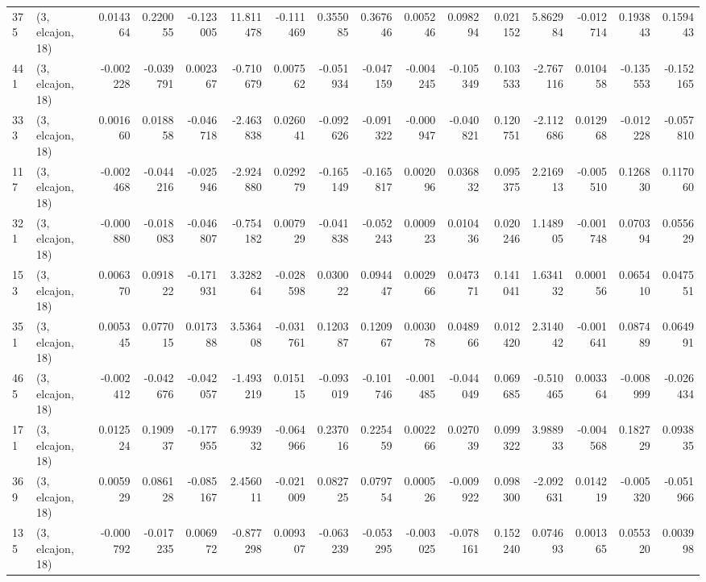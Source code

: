 \begin{tabular}{llrrrrrrrrrrrrrr}
375 &  (3, elcajon, 18) &   0.014364 &  0.220055 & -0.123005 &   11.811478 & -0.111469 &   0.355085 &  0.367646 &  0.005246 &  0.098294 &  0.021152 &    5.862984 & -0.012714 &  0.193843 &  0.159443 \\
441 &  (3, elcajon, 18) &  -0.002228 & -0.039791 &  0.002367 &   -0.710679 &  0.007562 &  -0.051934 & -0.047159 & -0.004245 & -0.105349 &  0.103533 &   -2.767116 &  0.010458 & -0.135553 & -0.152165 \\
333 &  (3, elcajon, 18) &   0.001660 &  0.018858 & -0.046718 &   -2.463838 &  0.026041 &  -0.092626 & -0.091322 & -0.000947 & -0.040821 &  0.120751 &   -2.112686 &  0.012968 & -0.012228 & -0.057810 \\
117 &  (3, elcajon, 18) &  -0.002468 & -0.044216 & -0.025946 &   -2.924880 &  0.029279 &  -0.165149 & -0.165817 &  0.002096 &  0.036832 &  0.095375 &    2.216913 & -0.005510 &  0.126830 &  0.117060 \\
321 &  (3, elcajon, 18) &  -0.000880 & -0.018083 & -0.046807 &   -0.754182 &  0.007929 &  -0.041838 & -0.052243 &  0.000923 &  0.010436 &  0.020246 &    1.148905 & -0.001748 &  0.070394 &  0.055629 \\
153 &  (3, elcajon, 18) &   0.006370 &  0.091822 & -0.171931 &    3.328264 & -0.028598 &   0.030022 &  0.094447 &  0.002966 &  0.047371 &  0.141041 &    1.634132 &  0.000156 &  0.065410 &  0.047551 \\
351 &  (3, elcajon, 18) &   0.005345 &  0.077015 &  0.017388 &    3.536408 & -0.031761 &   0.120387 &  0.120967 &  0.003078 &  0.048966 &  0.012420 &    2.314042 & -0.001641 &  0.087489 &  0.064991 \\
465 &  (3, elcajon, 18) &  -0.002412 & -0.042676 & -0.042057 &   -1.493219 &  0.015115 &  -0.093019 & -0.101746 & -0.001485 & -0.044049 &  0.069685 &   -0.510465 &  0.003364 & -0.008999 & -0.026434 \\
171 &  (3, elcajon, 18) &   0.012524 &  0.190937 & -0.177955 &    6.993932 & -0.064966 &   0.237016 &  0.225459 &  0.002266 &  0.027039 &  0.099322 &    3.988933 & -0.004568 &  0.182729 &  0.093835 \\
369 &  (3, elcajon, 18) &   0.005929 &  0.086128 & -0.085167 &    2.456011 & -0.021009 &   0.082725 &  0.079754 &  0.000526 & -0.009922 &  0.098300 &   -2.092631 &  0.014219 & -0.005320 & -0.051966 \\
135 &  (3, elcajon, 18) &  -0.000792 & -0.017235 &  0.006972 &   -0.877298 &  0.009307 &  -0.063239 & -0.053295 & -0.003025 & -0.078161 &  0.152240 &    0.074693 &  0.001365 &  0.055320 &  0.003998 \\

\end{tabular}
